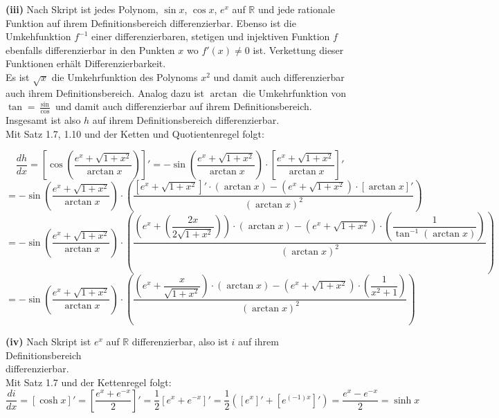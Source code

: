 \documentclass[a4paper,graphics,11pt]{article}
\begin{document}
\textbf{(iii)}
Nach Skript ist jedes Polynom, $\sin x$, $\cos x$, $e^x$ auf $\mathbb{R}$ und jede rationale Funktion auf ihrem
Definitionsbereich differenzierbar. Ebenso ist die Umkehfunktion $f^{-1}$ einer differenzierbaren, stetigen und
injektiven Funktion $f$ ebenfalls differenzierbar in den Punkten $x$ wo $f'(x) \neq 0$ ist. Verkettung dieser
Funktionen erhält Differenzierbarkeit.\\
Es ist $\sqrt{x}$ die Umkehrfunktion des Polynoms $x^2$ und damit auch differenzierbar auch ihrem Definitionsbereich.
Analog dazu ist $\arctan$ die Umkehrfunktion von $\tan = \frac{\sin}{\cos}$ und damit auch differenzierbar
auf ihrem Definitionsbereich. Insgesamt ist also $h$ auf ihrem Definitionsbereich differenzierbar.\\
Mit Satz 1.7, 1.10 und der Ketten und Quotientenregel folgt:

$$
    \frac{dh}{dx} = \left[\cos\left(\frac{e^x+\sqrt{1+x^2}}{\arctan x}\right)\right]'
    = -\sin\left(\frac{e^x+\sqrt{1+x^2}}{\arctan x}\right) \cdot
        \left[\frac{e^x+\sqrt{1+x^2}}{\arctan x}\right]'
$$$$
    = -\sin\left(\frac{e^x+\sqrt{1+x^2}}{\arctan x}\right) \cdot
        \left(\frac{\left[e^x+\sqrt{1+x^2}\right]'\cdot (\arctan x) -
        (e^x+\sqrt{1+x^2}) \cdot [\arctan x]'}{(\arctan x)^2} \right)
$$$$
    = -\sin\left(\frac{e^x+\sqrt{1+x^2}}{\arctan x}\right) \cdot
        \left(\frac{\left(e^x+\left(\dfrac{2x}{2\sqrt{1+x^2}}\right)\right)\cdot (\arctan x) -
        (e^x+\sqrt{1+x^2}) \cdot \left(\dfrac{1}{\tan^{-1}(\arctan x)}\right)}{(\arctan x)^2} \right)
$$$$
    = -\sin\left(\frac{e^x+\sqrt{1+x^2}}{\arctan x}\right) \cdot
        \left(\frac{\left(e^x+\dfrac{x}{\sqrt{1+x^2}}\right)\cdot (\arctan x) -
        (e^x+\sqrt{1+x^2}) \cdot \left(\dfrac{1}{x^2+1}\right)}{(\arctan x)^2}
        \right)
$$

\textbf{(iv)}
Nach Skript ist $e^x$ auf $\mathbb{R}$ differenzierbar, also ist $i$ auf ihrem Definitionsbereich\\
differenzierbar.\\
Mit Satz 1.7 und der Kettenregel folgt:
$$
    \frac{di}{dx} = [\cosh x]'
    = \left[\frac{e^x+e^{-x}}{2}\right]'
    = \frac{1}{2} \left[e^x+e^{-x}\right]'
    = \frac{1}{2} \left([e^x]' + [e^{(-1)x}]'\right)
    = \frac{e^x-e^{-x}}{2}
    = \sinh x
$$
\end{document}
